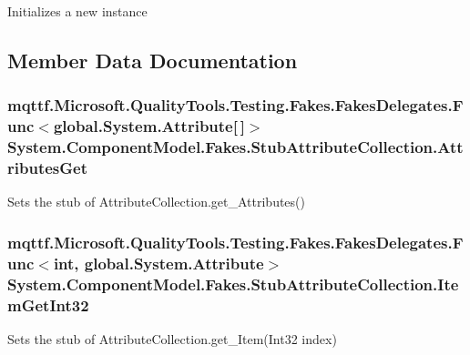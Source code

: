 Initializes a new instance



\subsection{Member Data Documentation}
\hypertarget{class_system_1_1_component_model_1_1_fakes_1_1_stub_attribute_collection_aaac4d775b4f40fcbca96c51694a8c812}{
\subsubsection[{Attributes\-Get}]{\setlength{\rightskip}{0pt plus 5cm}mqttf.\-Microsoft.\-Quality\-Tools.\-Testing.\-Fakes.\-Fakes\-Delegates.\-Func$<$global.\-System.\-Attribute\mbox{[}$\,$\mbox{]}$>$ System.\-Component\-Model.\-Fakes.\-Stub\-Attribute\-Collection.\-Attributes\-Get}}\label{class_system_1_1_component_model_1_1_fakes_1_1_stub_attribute_collection_aaac4d775b4f40fcbca96c51694a8c812}


Sets the stub of Attribute\-Collection.\-get\-\_\-\-Attributes()

\hypertarget{class_system_1_1_component_model_1_1_fakes_1_1_stub_attribute_collection_a1e97f26fb9e11cf6d8d86fcb621b2d05}{
\subsubsection[{Item\-Get\-Int32}]{\setlength{\rightskip}{0pt plus 5cm}mqttf.\-Microsoft.\-Quality\-Tools.\-Testing.\-Fakes.\-Fakes\-Delegates.\-Func$<$int, global.\-System.\-Attribute$>$ System.\-Component\-Model.\-Fakes.\-Stub\-Attribute\-Collection.\-Item\-Get\-Int32}}\label{class_system_1_1_component_model_1_1_fakes_1_1_stub_attribute_collection_a1e97f26fb9e11cf6d8d86fcb621b2d05}


Sets the stub of Attribute\-Collection.\-get\-\_\-\-Item(\-Int32 index)

